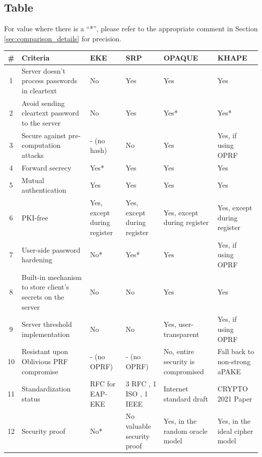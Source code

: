 ﻿\documentclass[../report.tex]{subfiles}
\begin{document}
\subsection{Table}
For value where there is a ``*'', please refer to the appropriate comment in Section \ref{sec:comparison_details} for precision.
\begin{center}
   \begin{tabular}{ | c | p{5cm} || p{2cm} | p{2cm} | p{2cm} | p{2cm} | }
     \hline
     \textbf{\#} & \textbf{Criteria} & \textbf{EKE} & \textbf{SRP} & \textbf{OPAQUE} & \textbf{KHAPE} \\ \hline
     
     
     
     1 & Server doesn't process passwords in cleartext & No & Yes & Yes & Yes \\ \hline
     2 & Avoid sending cleartext password to the server & No & Yes & Yes* & Yes* \\ \hline
     
     3 & Secure against pre-computation attacks & - (no hash) & No & Yes & Yes, if using OPRF \\ \hline
     4 & Forward secrecy & Yes* & Yes & Yes & Yes \\ \hline
     5 & Mutual authentication & Yes & Yes & Yes & Yes \\ \hline
     6 & PKI-free & Yes, except during register & Yes, except during register & Yes, except during register & Yes, except during register \\ \hline
     7 & User-side password hardening & No* & Yes* & Yes & Yes, if using OPRF \\ \hline
     8 & Built-in mechanism to store client's secrets on the server & No & No & Yes & Yes \\ \hline
     9 & Server threshold implementation & No & No & Yes, user-transparent & Yes, if using OPRF \\ \hline
     10 & Resistant upon Oblivious PRF compromise & - (no OPRF) & - (no OPRF) & No, entire security is compromised & Fall back to non-strong aPAKE \\ \hline
     11 & Standardization status & RFC for EAP-EKE \cite{EAP_EKE_RFC} & 3 RFC \cite{SRP_RFC_1, SRP_RFC_2, SRP_RFC_3}, 1 ISO \cite{SRP_ISO}, 1 IEEE \cite{SRP_IEEE} & Internet standard draft \cite{OPAQUE_Standard_Draft} & CRYPTO 2021 Paper \cite{KHAPE_Paper} \\ \hline
     12 & Security proof & No* & No valuable security proof & Yes, in the random oracle model & Yes, in the ideal cipher model \\ \hline
     
     \end{tabular}
 \end{center}
 
\end{document}
